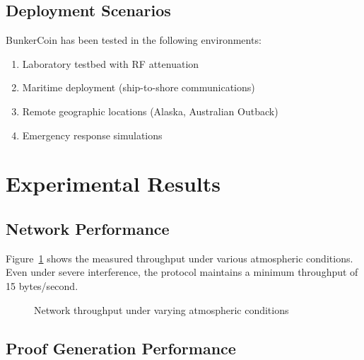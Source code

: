\documentclass[11pt,a4paper]{article}
\begin{document}
\subsection{Deployment Scenarios}

BunkerCoin has been tested in the following environments:
\begin{enumerate}
\item Laboratory testbed with RF attenuation
\item Maritime deployment (ship-to-shore communications)
\item Remote geographic locations (Alaska, Australian Outback)
\item Emergency response simulations
\end{enumerate}

\section{Experimental Results}

\subsection{Network Performance}

Figure~\ref{fig:throughput} shows the measured throughput under various atmospheric conditions. Even under severe interference, the protocol maintains a minimum throughput of 15 bytes/second.

\begin{figure}[h]
\centering
{}
\caption{Network throughput under varying atmospheric conditions}
\label{fig:throughput}
\end{figure}

\subsection{Proof Generation Performance}
\end{document}
